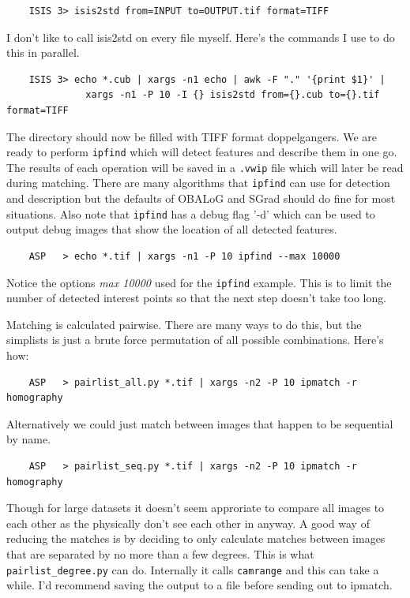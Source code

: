 \begin{verbatim}
    ISIS 3> isis2std from=INPUT to=OUTPUT.tif format=TIFF
\end{verbatim}

I don't like to call isis2std on every file myself. Here's the
commands I use to do this in parallel.

\begin{verbatim}
    ISIS 3> echo *.cub | xargs -n1 echo | awk -F "." '{print $1}' |
              xargs -n1 -P 10 -I {} isis2std from={}.cub to={}.tif format=TIFF
\end{verbatim}

The directory should now be filled with TIFF format doppelgangers. We
are ready to perform \texttt{ipfind} which will detect features and
describe them in one go. The results of each operation will be saved
in a \texttt{.vwip} file which will later be read during
matching. There are many algorithms that \texttt{ipfind} can use for
detection and description but the defaults of OBALoG and SGrad should
do fine for most situations. Also note that \texttt{ipfind} has a
debug flag '-d' which can be used to output debug images that show the
location of all detected features.

\begin{verbatim}
    ASP   > echo *.tif | xargs -n1 -P 10 ipfind --max 10000
\end{verbatim}

Notice the options \emph{\-\-max 10000} used for the \texttt{ipfind}
example. This is to limit the number of detected interest points so
that the next step doesn't take too long.

Matching is calculated pairwise. There are many ways to do this, but
the simplists is just a brute force permutation of all possible
combinations. Here's how:

\begin{verbatim}
    ASP   > pairlist_all.py *.tif | xargs -n2 -P 10 ipmatch -r homography
\end{verbatim}

Alternatively we could just match between images that happen to be
sequential by name.

\begin{verbatim}
    ASP   > pairlist_seq.py *.tif | xargs -n2 -P 10 ipmatch -r homography
\end{verbatim}

Though for large datasets it doesn't seem approriate to compare all
images to each other as the physically don't see each other in
anyway. A good way of reducing the matches is by deciding to only
calculate matches between images that are separated by no more than a
few degrees. This is what \texttt{pairlist\_degree.py} can
do. Internally it calls \texttt{camrange} and this can take a
while. I'd recommend saving the output to a file before sending out to
ipmatch.

